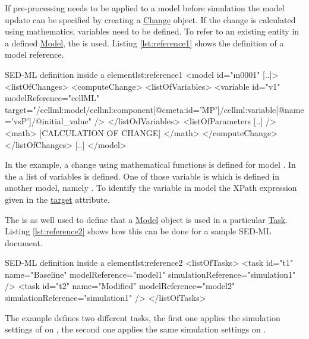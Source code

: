 If pre-processing needs to be applied to a model before simulation the model update can be specified by creating a \hyperref[class:Change]{Change} object. If the change is calculated using mathematics, variables need to be defined. To refer to an existing entity in a defined \hyperref[class:model]{Model}, the  is used. Listing \ref{lst:reference1} shows the definition of a model reference.
%
\begin{myXmlLst}{SED-ML  definition inside a  element}{lst:reference1}
<model id="m0001" [..]>
 <listOfChanges>
   <computeChange>
    <listOfVariables>
     <variable id="v1" modelReference="cellML" target="/cellml:model/cellml:component[@cmeta:id='MP']/cellml:variable[@name='vsP']/@initial_value" />
    </listOdVariables>
    <listOfParameters [..] />
    <math>
     [CALCULATION OF CHANGE]
    </math>
   </computeChange>
 </listOfChanges>
 [..]
</model>
\end{myXmlLst}
%
In the example, a change using mathematical functions is defined for model . In the  a list of variables is defined. One of those variable is  which is defined in another model, namely . To identify the variable in model  the XPath expression given in the \hyperref[sec:target]{target} attribute.

The  is as well used to define that a \hyperref[class:model]{Model} object is used in a particular  \hyperref[class:task]{Task}. 
Listing \ref{lst:reference2} shows how this can be done for a sample SED-ML document.
%
\begin{myXmlLst}{SED-ML  definition inside a  element}{lst:reference2}
<listOfTasks>
 <task id="t1" name="Baseline" modelReference="model1" simulationReference="simulation1" />
 <task id="t2" name="Modified" modelReference="model2" simulationReference="simulation1" />
</listOfTasks>
\end{myXmlLst}
%
The example defines two different tasks, the first one applies the simulation settings of  on , the second one applies the same simulation settings on .


